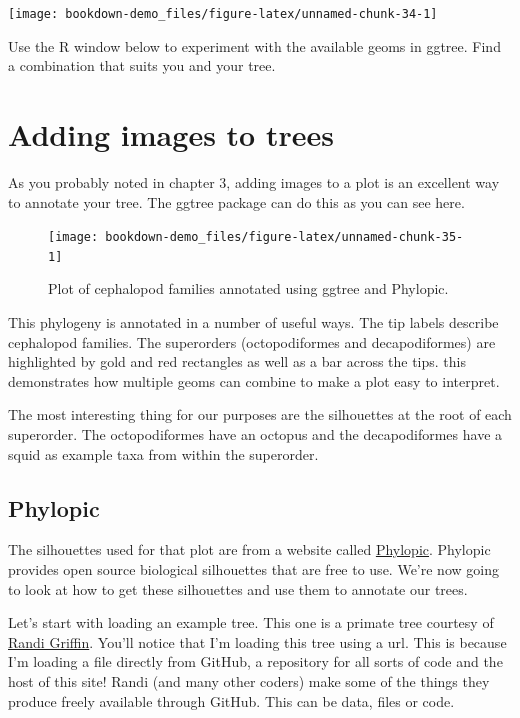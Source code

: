\documentclass[
]{book}
\begin{document}
\begin{center}\texttt{[image: bookdown-demo\_files/figure-latex/unnamed-chunk-34-1]} \end{center}

Use the R window below to experiment with the available geoms in ggtree. Find a combination that suits you and your tree.

\hypertarget{adding-images-to-trees}{%
\section{Adding images to trees}\label{adding-images-to-trees}}

As you probably noted in chapter 3, adding images to a plot is an excellent way to annotate your tree. The ggtree package can do this as you can see here.

\begin{figure}[H]

{\centering \texttt{[image: bookdown-demo\_files/figure-latex/unnamed-chunk-35-1]} 

}

\caption{Plot of cephalopod families annotated using ggtree and Phylopic.}\label{fig:unnamed-chunk-35}
\end{figure}

This phylogeny is annotated in a number of useful ways. The tip labels describe cephalopod families. The superorders (octopodiformes and decapodiformes) are highlighted by gold and red rectangles as well as a bar across the tips. this demonstrates how multiple geoms can combine to make a plot easy to interpret.

The most interesting thing for our purposes are the silhouettes at the root of each superorder. The octopodiformes have an octopus and the decapodiformes have a squid as example taxa from within the superorder.

\hypertarget{phylopic}{%
\subsection{Phylopic}\label{phylopic}}

The silhouettes used for that plot are from a website called \href{http://phylopic.org/}{Phylopic}. Phylopic provides open source biological silhouettes that are free to use. We're now going to look at how to get these silhouettes and use them to annotate our trees.

Let's start with loading an example tree. This one is a primate tree courtesy of \href{https://www.randigriffin.com/}{Randi Griffin}. You'll notice that I'm loading this tree using a url. This is because I'm loading a file directly from GitHub, a repository for all sorts of code and the host of this site! Randi (and many other coders) make some of the things they produce freely available through GitHub. This can be data, files or code.
\end{document}
